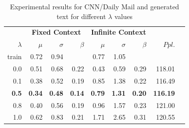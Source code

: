 \documentclass[11pt,a4paper]{article}
\begin{document}
\begin{table}[hbt!]
\small
\centering
    \begin{tabular}{rrrrrrrrr}%
     \toprule
      & \multicolumn{3}{c}{\textbf{Fixed Context}}
          & \multicolumn{3}{c}{\textbf{Infinite Context} } & \multicolumn{1}{c}{}  \\
    \textbf{$\lambda$}  & \textbf{$\mu$} & \textbf{$\sigma$}  & \textbf{$\beta$} & \textbf{$\mu$} & \textbf{$\sigma$}  & \textbf{$\beta$} &   \textbf{$Ppl.$}\\
      \midrule



train & 0.72 & 0.94 &  & 0.77 & 1.05 &  &  \\

0.0 & 0.51 & 0.68 & 0.22 & 0.43 & 0.59 & 0.29 & 118.01 \\

0.1 & 0.38 & 0.52 & 0.19 & 0.85 & 1.38 & 0.22 & 116.49 \\

\textbf{0.5} & \textbf{0.34} & \textbf{0.48} & \textbf{0.14} & \textbf{0.79} & \textbf{1.31} & \textbf{0.20} & \textbf{116.19} \\

0.8 & 0.40 & 0.56 & 0.19 & 0.96 & 1.57 & 0.23 & 121.00 \\

1.0 & 0.62 & 0.83 & 0.21 & 1.71 & 2.65 & 0.31 & 120.55 \\

    
    \bottomrule
    \hline
    \end{tabular}
    \caption{Experimental results for CNN/Daily Mail and generated text for different $\lambda$  values}
    \label{tab:3}
\end{table}
\end{document}
